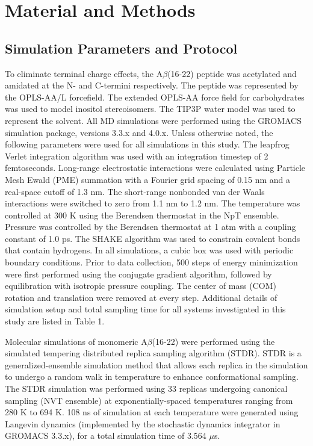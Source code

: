 \section{Material and Methods} %
\label{sec:material_and_methods}

\subsection{Simulation Parameters and Protocol}

To eliminate terminal charge effects, the A$\beta$(16-22) peptide was acetylated and amidated at the N- and C-termini respectively. The peptide was represented by the OPLS-AA/L forcefield.\cite{Jorgensen:1996p19} The extended OPLS-AA force field for carbohydrates\cite{Damm:1997p36} was used to model inositol stereoisomers. The TIP3P water model\cite{Jorgensen:1983p40} was used to represent the solvent. All MD simulations were performed using the GROMACS simulation package,\cite{Hess:2008p264,VanDerSpoel:2005p56} versions 3.3.x and 4.0.x. Unless otherwise noted, the following parameters were used for all simulations in this study. The leapfrog Verlet integration algorithm was used with an integration timestep of 2 femtoseconds. Long-range electrostatic interactions were calculated using Particle Mesh Ewald (PME) summation with a Fourier grid spacing of 0.15 nm and a real-space cutoff of 1.3 nm.\cite{Darden:1993p266} The short-range nonbonded van der Waals interactions were switched to zero from 1.1 nm to 1.2 nm. The temperature was controlled at 300 K using the Berendsen thermostat in the NpT ensemble.\cite{Berendsen:1984p26} Pressure was controlled by the Berendsen thermostat at 1 atm with a coupling constant of 1.0 ps.\cite{Berendsen:1984p26} The SHAKE algorithm was used to constrain covalent bonds that contain hydrogens.\cite{Ryckaert:1977p30} In all simulations, a cubic box was used with periodic boundary conditions. Prior to data collection, 500 steps of energy minimization were first performed using the conjugate gradient algorithm, followed by equilibration with isotropic pressure coupling. The center of mass (COM) rotation and translation were removed at every step. Additional details of simulation setup and total sampling time for all systems investigated in this study are listed in Table 1.

Molecular simulations of monomeric A$\beta$(16-22) were performed using the simulated tempering distributed replica sampling algorithm (STDR).\cite{Rauscher:2009p166} STDR is a generalized-ensemble simulation method that allows each replica in the simulation to undergo a random walk in temperature to enhance conformational sampling.\cite{Rauscher:2009p166,Rodinger:2006p78} The STDR simulation was performed using 33 replicas undergoing canonical sampling (NVT ensemble) at exponentially-spaced temperatures ranging from 280 K to 694 K. 108 ns of simulation at each temperature were generated using Langevin dynamics (implemented by the stochastic dynamics integrator in GROMACS 3.3.x), for a total simulation time of 3.564 $\mu$s.

